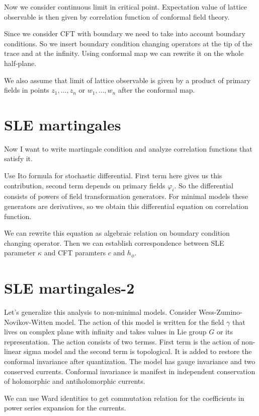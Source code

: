 \documentclass[a4paper]{article}
\begin{document}
Now we consider continuous limit in critical point. Expectation value of lattice observable is then
given by correlation function of conformal field theory. 

Since we consider CFT with boundary we need to take into account boundary conditions. So we insert
boundary condition changing operators at the tip of the trace and at the infinity. Using conformal
map we can rewrite it on the whole half-plane. 

We also assume that limit of lattice observable is given by a product of primary fields in points
$z_{1}, \dots, z_{n}$ or $w_{1},\dots,w_{n}$ after the conformal map. 

\section{SLE martingales}
\label{sec:sle-martingales}

Now I want to write martingale condition and analyze correlation functions that satisfy it. 

Use Ito formula for stochastic differential. First term here gives us this contribution, second term
depends on primary fields $\varphi_{i}$. So the differential consists of powers of field
transformation generators. For minimal models these generators are derivatives, so we obtain this
differential equation on correlation function. 

We can rewrite this equation as algebraic relation on boundary condition changing operator. Then we
can establish correspondence between SLE parameter $\kappa$ and CFT paramters $c$ and $h_{\phi}$. 

\section{SLE martingales-2}
Let's generalize this analysis to non-minimal models. Consider Wess-Zumino-Novikov-Witten model. The
action of this model is written for the field $\gamma$ that lives on complex plane with infinity and
takes values in Lie group $G$ or its representation. The action consists of two termss. First term
is the action of non-linear sigma model and the second term is topological. It is added to restore
the conformal invariance after quantization. The model has gauge invariance and two conserved
currents. Conformal invariance is manifest in independent conservation of holomorphic and
antiholomorphic currents. 

We can use Ward identities to get commutation relation for the coefficients in power series
expansion for the currents.
\end{document}
